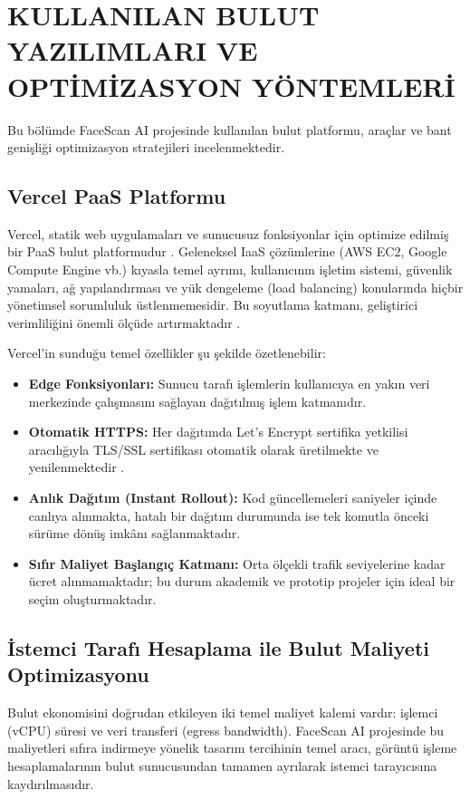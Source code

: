 \section{KULLANILAN BULUT YAZILIMLARI VE OPTİMİZASYON YÖNTEMLERİ}

Bu bölümde FaceScan AI projesinde kullanılan bulut platformu, araçlar ve bant genişliği optimizasyon stratejileri incelenmektedir.

\subsection{Vercel PaaS Platformu}

Vercel, statik web uygulamaları ve sunucusuz fonksiyonlar için optimize edilmiş bir PaaS bulut platformudur \cite{vercel2023docs}. Geleneksel IaaS çözümlerine (AWS EC2, Google Compute Engine vb.) kıyasla temel ayrımı, kullanıcının işletim sistemi, güvenlik yamaları, ağ yapılandırması ve yük dengeleme (load balancing) konularında hiçbir yönetimsel sorumluluk üstlenmemesidir. Bu soyutlama katmanı, geliştirici verimliliğini önemli ölçüde artırmaktadır \cite{jonas2019cloud}.

Vercel'in sunduğu temel özellikler şu şekilde özetlenebilir:
\begin{itemize}
  \item \textbf{Edge Fonksiyonları:} Sunucu tarafı işlemlerin kullanıcıya en yakın veri merkezinde çalışmasını sağlayan dağıtılmış işlem katmanıdır.
  \item \textbf{Otomatik HTTPS:} Her dağıtımda Let's Encrypt sertifika yetkilisi aracılığıyla TLS/SSL sertifikası otomatik olarak üretilmekte ve yenilenmektedir \cite{letsencrypt2023}.
  \item \textbf{Anlık Dağıtım (Instant Rollout):} Kod güncellemeleri saniyeler içinde canlıya alınmakta, hatalı bir dağıtım durumunda ise tek komutla önceki sürüme dönüş imkânı sağlanmaktadır.
  \item \textbf{Sıfır Maliyet Başlangıç Katmanı:} Orta ölçekli trafik seviyelerine kadar ücret alınmamaktadır; bu durum akademik ve prototip projeler için ideal bir seçim oluşturmaktadır.
\end{itemize}

\subsection{İstemci Tarafı Hesaplama ile Bulut Maliyeti Optimizasyonu}

Bulut ekonomisini doğrudan etkileyen iki temel maliyet kalemi vardır: işlemci (vCPU) süresi ve veri transferi (egress bandwidth). FaceScan AI projesinde bu maliyetleri sıfıra indirmeye yönelik tasarım tercihinin temel aracı, görüntü işleme hesaplamalarının bulut sunucusundan tamamen ayrılarak istemci tarayıcısına kaydırılmasıdır.

